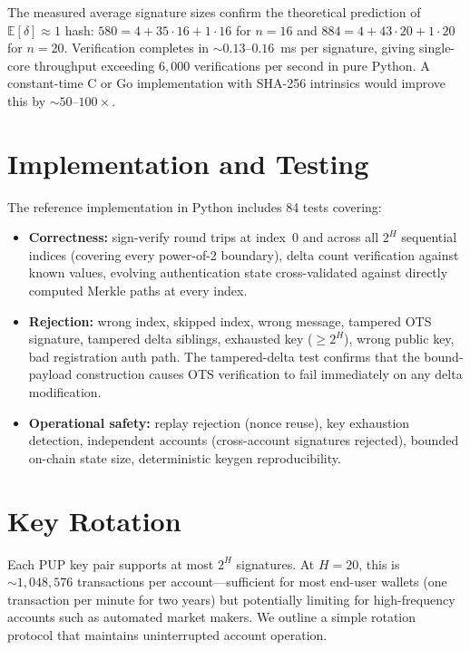 \documentclass[11pt]{article}
\begin{document}
The measured average signature sizes confirm the theoretical prediction
of $\mathbb{E}[\delta] \approx 1$ hash: $580 = 4 + 35 \cdot 16 + 1
\cdot 16$ for $n = 16$ and $884 = 4 + 43 \cdot 20 + 1 \cdot 20$ for
$n = 20$. Verification completes in ${\sim}0.13$--$0.16$~ms per
signature, giving single-core throughput exceeding $6{,}000$
verifications per second in pure Python. A constant-time C or Go
implementation with SHA-256 intrinsics would improve this by
${\sim}50$--$100\times$.

\section{Implementation and Testing}

The reference implementation in Python includes 84 tests covering:

\begin{itemize}
\item \textbf{Correctness:} sign-verify round trips at index~$0$ and
across all $2^H$ sequential indices (covering every power-of-2
boundary), delta count verification against known values, evolving
authentication state cross-validated against directly computed Merkle
paths at every index.

\item \textbf{Rejection:} wrong index, skipped index, wrong message,
tampered OTS signature, tampered delta siblings, exhausted key
($\geq 2^H$), wrong public key, bad registration auth path. The
tampered-delta test confirms that the bound-payload construction
causes OTS verification to fail immediately on any delta modification.

\item \textbf{Operational safety:} replay rejection (nonce reuse),
key exhaustion detection, independent accounts (cross-account
signatures rejected), bounded on-chain state size, deterministic
keygen reproducibility.
\end{itemize}

\section{Key Rotation}\label{sec:rotation}

Each PUP key pair supports at most $2^H$ signatures. At $H = 20$,
this is ${\sim}1{,}048{,}576$ transactions per account---sufficient for
most end-user wallets (one transaction per minute for two years) but
potentially limiting for high-frequency accounts such as automated
market makers. We outline a simple rotation protocol that maintains
uninterrupted account operation.
\end{document}
